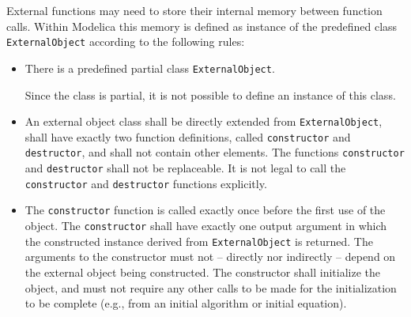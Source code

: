 External functions may need to store their internal memory between function calls.
Within Modelica this memory is defined as instance of the predefined class \lstinline!ExternalObject! according to the following rules:
\begin{itemize}
\item
  There is a predefined partial class \lstinline!ExternalObject!.
  \begin{nonnormative}
  Since the class is partial, it is not possible to define an instance of this class.
  \end{nonnormative}
\item
  An external object class shall be directly extended from \lstinline!ExternalObject!, shall have exactly two function definitions, called \lstinline!constructor! and \lstinline!destructor!, and shall not contain other elements.
  The functions \lstinline!constructor! and \lstinline!destructor! shall not be replaceable.
  It is not legal to call the \lstinline!constructor! and \lstinline!destructor! functions explicitly.
\item
  The \lstinline!constructor! function is called exactly once before the first use of the object.
  The \lstinline!constructor! shall have exactly one output argument in which the constructed instance derived from \lstinline!ExternalObject! is returned.
  The arguments to the constructor must not -- directly nor indirectly -- depend on the external object being constructed.
  The constructor shall initialize the object, and must not require any other calls to be made for the initialization to be complete (e.g., from an initial algorithm or initial equation).


\end{itemize}
